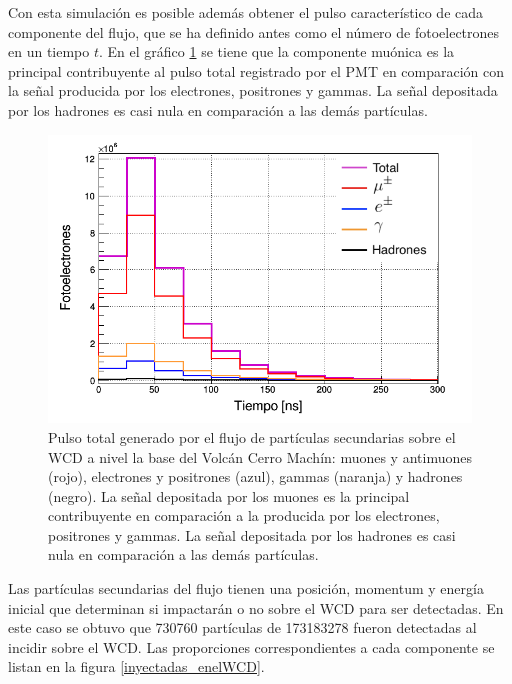 \documentclass[12pt,oneside,openany,letter]{book}
\begin{document}
Con esta simulación es posible además obtener el pulso característico de cada componente del flujo, que se ha definido antes como el número de fotoelectrones en un tiempo $t$. En el gráfico \ref{pulso_flujo} se tiene que la componente muónica es la principal contribuyente al pulso total registrado por el PMT en comparación con la señal producida por los electrones, positrones y gammas. La señal depositada por los hadrones es casi nula en comparación a las demás partículas.
\begin{figure}[h]
\centering
\includegraphics[scale=0.45]{pulso_flujo.png}
\caption[Pulso total generado por el flujo de partículas secundarias sobre el WCD a nivel del Volcán Cerro Machín]{
Pulso total generado por el flujo de partículas secundarias sobre el WCD a nivel la base del Volcán Cerro Machín: muones y antimuones (rojo), electrones y positrones (azul), gammas (naranja) y hadrones (negro). La señal depositada por los muones es la principal contribuyente en comparación a la producida por los electrones, positrones y gammas. La señal depositada por los hadrones es casi nula en comparación a las demás partículas.
\label{pulso_flujo} }
\end{figure}

Las partículas secundarias del flujo tienen una posición, momentum y energía inicial que determinan si impactarán o no sobre el WCD para ser detectadas. En este caso se obtuvo que 730760 partículas de 173183278 fueron detectadas al incidir sobre el WCD. Las proporciones correspondientes a cada componente se listan en la figura \ref{inyectadas_enelWCD}.
\end{document}
